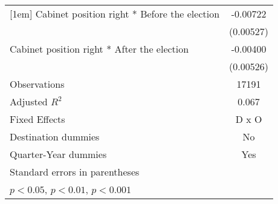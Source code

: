 \begin{table}[htbp]
\begin{tabular}{l*{1}{c}}
[1em]
Cabinet position right * Before the election&    -0.00722         \\
                    &   (0.00527)         \\
[1em]
Cabinet position right * After the election&    -0.00400         \\
                    &   (0.00526)         \\
\hline
Observations        &       17191         \\
Adjusted \(R^{2}\)  &       0.067         \\
Fixed Effects       &       D x O         \\
Destination dummies &          No         \\
Quarter-Year dummies&         Yes         \\
\hline\hline
\multicolumn{2}{l}{\footnotesize Standard errors in parentheses}\\
\multicolumn{2}{l}{\footnotesize \sym{*} \(p<0.05\), \sym{**} \(p<0.01\), \sym{***} \(p<0.001\)}\\
\end{tabular}
\end{table}
